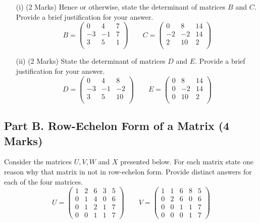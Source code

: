 \documentclass[a4paper,12pt]{article}
\begin{document}
\begin{itemize}
	\item[(i)] (2 Marks) Hence or otherwise, state the determinant of matrices $B$ and $C$. Provide a brief justification for your answer.
	\[B = \left(\begin{array}{rrr}
	0  &  4   & 7 \\
	-3  & -1  &  7\\
	3   & 5  &  1\\
	\end{array}\right) \qquad C = \left(\begin{array}{rrr}
	0  &  8   & 14 \\
	-2  & -2  &  14\\
	2   & 10  &  2\\
	\end{array}\right) \]
	
	\item[(ii)] (2 Marks) State the determinant of matrices $D$ and $E$. Provide a brief justification for your answer.
	\[D = \left(\begin{array}{rrr}
	0  &  4   & 8 \\
	-3  & -1  &  -2\\
	3   & 5  &  10\\
	\end{array}\right) \qquad E = \left(\begin{array}{rrr}
	0  &  8   & 14 \\
	0  & -2  &  14\\
	0   & 10  &  2\\
	\end{array}\right) \]
\end{itemize}




\subsection*{Part B. Row-Echelon Form of a Matrix (4 Marks)}
Consider the matrices $U,V,W$ and $X$ presented below. For each matrix state one reason why that matrix in not in row-echelon form. Provide distinct answers for each of the four matrices.
\[
U = \begin{pmatrix}
1&2 & 6  &3 & 5
\\  0&1&4 &0 & 6
\\  0&1&2 &1 & 7
\\  0&0&1 &1 & 7
\end{pmatrix} \qquad  V = \begin{pmatrix}
1&1 & 6  &8 & 5
\\  0&2&6 &0 & 6
\\  0&0&1 &1 & 7
\\  0&0&0 &1 & 7
\end{pmatrix}
\]
\end{document}
